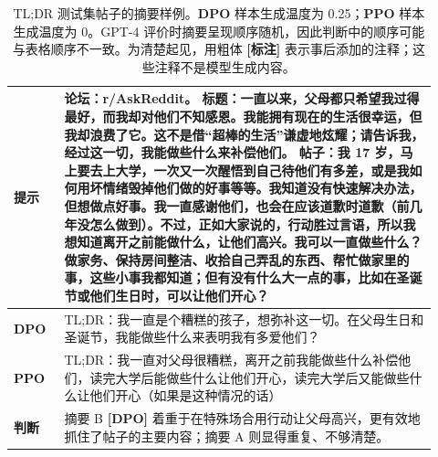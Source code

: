 \begingroup\setlength{\LTcapwidth}{.97\linewidth}
\begin{longtable}{p{0.11\linewidth}p{0.81\linewidth}}
\caption{TL;DR 测试集帖子的摘要样例。\textbf{DPO} 样本生成温度为 0.25；\textbf{PPO} 样本生成温度为 0。GPT-4 评价时摘要呈现顺序随机，因此判断中的顺序可能与表格顺序不一致。为清楚起见，用粗体 \textbf{[标注]} 表示事后添加的注释；这些注释不是模型生成内容。}\label{dpo-tab:summ-ex-1}\\

        \toprule
\textbf{提示} & 论坛：r/AskReddit。\newline
标题：一直以来，父母都只希望我过得最好，而我却对他们不知感恩。我能拥有现在的生活很幸运，但我却浪费了它。这不是借“超棒的生活”谦虚地炫耀；请告诉我，经过这一切，我能做些什么来补偿他们。\newline
帖子：我 17 岁，马上要去上大学，一次又一次醒悟到自己待他们有多差，或是我如何用坏情绪毁掉他们做的好事等等。我知道没有快速解决办法，但想做点好事。我一直感谢他们，也会在应该道歉时道歉（前几年没怎么做到）。不过，正如大家说的，行动胜过言语，所以我想知道离开之前能做什么，让他们高兴。我可以一直做些什么？做家务、保持房间整洁、收拾自己弄乱的东西、帮忙做家里的事，这些小事我都知道；但有没有什么大一点的事，比如在圣诞节或他们生日时，可以让他们开心？ \\
        \midrule
\textbf{DPO} & TL;DR：我一直是个糟糕的孩子，想弥补这一切。在父母生日和圣诞节，我能做些什么来表明我有多爱他们？\\
        \midrule
\textbf{PPO} & TL;DR：我一直对父母很糟糕，离开之前我能做些什么补偿他们，读完大学后能做些什么让他们开心，读完大学后又能做些什么让他们开心（如果是这种情况的话）\\
        \midrule
\textbf{判断} & 摘要 B \textbf{[DPO]} 着重于在特殊场合用行动让父母高兴，更有效地抓住了帖子的主要内容；摘要 A 则显得重复、不够清楚。\\
        \bottomrule
    
\end{longtable}
\endgroup

